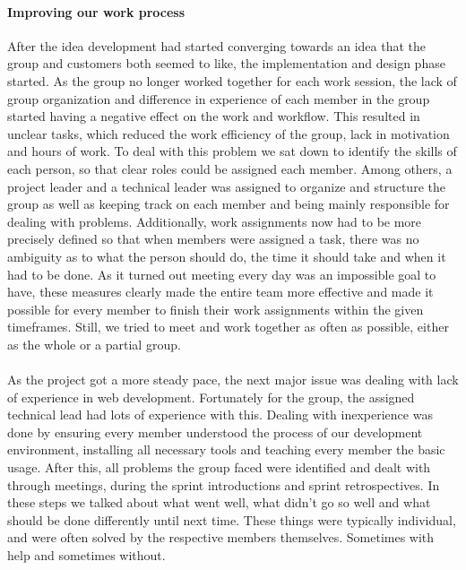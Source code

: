 \paragraph{Improving our work process} After the idea development had started converging towards an idea that the group and customers both seemed to like, the implementation and design phase started. As the group no longer worked together for each work session, the lack of group organization and difference in experience of each member in the group started having a negative effect on the work and workflow. This resulted in unclear tasks, which reduced the work efficiency of the group, lack in motivation and hours of work. To deal with this problem we sat down to identify the skills of each person, so that clear roles could be assigned each member. Among others, a project leader and a technical leader was assigned to organize and structure the group as well as keeping track on each member and being mainly responsible for dealing with problems. Additionally, work assignments now had to be more precisely defined so that when members were assigned a task, there was no ambiguity as to what the person should do, the time it should take and when it had to be done. As it turned out meeting every day was an impossible goal to have, these measures clearly made the entire team more effective and made it possible for every member to finish their work assignments within the given timeframes. Still, we tried to meet and work together as often as possible, either as the whole or a partial group. 
\paragraph{} As the project got a more steady pace, the next major issue was dealing with lack of experience in web development. Fortunately for the group, the assigned technical lead had lots of experience with this. Dealing with inexperience was done by ensuring every member understood the process of our development environment, installing all necessary tools and teaching every member the basic usage. After this, all problems the group faced were identified and dealt with through meetings, during the sprint introductions and sprint retrospectives. In these steps we talked about what went well, what didn’t go so well and what should be done differently until next time. These things were typically individual, and were often solved by the respective members themselves. Sometimes with help and sometimes without. 
